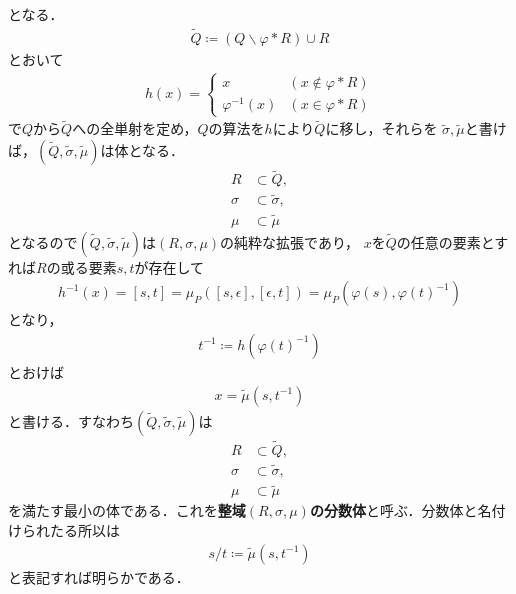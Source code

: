 	となる．
	\begin{align}
		\tilde{Q} \coloneqq (Q \backslash \varphi \ast R) \cup R
	\end{align}
	とおいて
	\begin{align}
		h(x) = 
		\begin{cases}
			x & (x \notin \varphi \ast R) \\
			\varphi^{-1}(x) & (x \in \varphi \ast R)
		\end{cases}
	\end{align}
	で$Q$から$\tilde{Q}$への全単射を定め，$Q$の算法を$h$により$\tilde{Q}$に移し，それらを
	$\tilde{\sigma},\tilde{\mu}$と書けば，$(\tilde{Q},\tilde{\sigma},\tilde{\mu})$は体となる．
	\begin{align}
		R &\subset \tilde{Q}, \\
		\sigma &\subset \tilde{\sigma}, \\
		\mu &\subset \tilde{\mu}
	\end{align}
	となるので$(\tilde{Q},\tilde{\sigma},\tilde{\mu})$は$(R,\sigma,\mu)$の純粋な拡張であり，
	$x$を$\tilde{Q}$の任意の要素とすれば$R$の或る要素$s,t$が存在して
	\begin{align}
		h^{-1}(x) = [s,t] = \mu_P([s,\epsilon],[\epsilon,t]) = \mu_P(\varphi(s),\varphi(t)^{-1})
	\end{align}
	となり，
	\begin{align}
		t^{-1} \coloneqq h(\varphi(t)^{-1})
	\end{align}
	とおけば
	\begin{align}
		x = \tilde{\mu}(s,t^{-1})
	\end{align}
	と書ける．すなわち$(\tilde{Q},\tilde{\sigma},\tilde{\mu})$は
	\begin{align}
		R &\subset \tilde{Q}, \\
		\sigma &\subset \tilde{\sigma}, \\
		\mu &\subset \tilde{\mu}
	\end{align}
	を満たす最小の体である．これを{\bf 整域$(R,\sigma,\mu)$の分数体}と呼ぶ．分数体と名付けられたる所以は
	\begin{align}
		s/t \coloneqq \tilde{\mu}(s,t^{-1})
	\end{align}
	と表記すれば明らかである．
	
\newpage